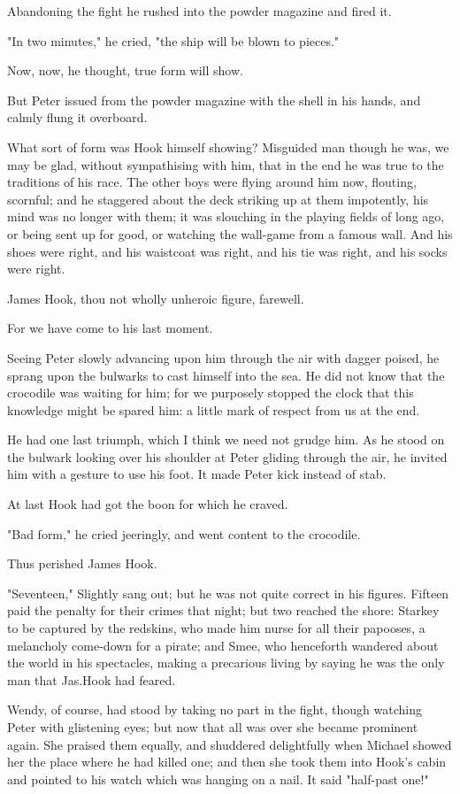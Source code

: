 Abandoning the fight he rushed into the powder magazine and fired it.

"In two minutes," he cried, "the ship will be blown to pieces."

Now, now, he thought, true form will show.

But Peter issued from the powder magazine with the shell in his hands,
and calmly flung it overboard.

What sort of form was Hook himself showing?
Misguided man though he was,
we may be glad, without sympathising with him,
that in the end he was true to the traditions of his race.
The other boys were flying around him now, flouting, scornful;
and he staggered about the deck striking up at them impotently,
his mind was no longer with them;
it was slouching in the playing fields of long ago, or being sent up for good,
or watching the wall-game from a famous wall.
And his shoes were right, and his waistcoat was right, and his tie was right, and his socks were right.

James Hook, thou not wholly unheroic figure, farewell.

For we have come to his last moment.

Seeing Peter slowly advancing upon him through the air with dagger poised,
he sprang upon the bulwarks to cast himself into the sea.
He did not know that the crocodile was waiting for him;
for we purposely stopped the clock that this knowledge might be spared him:
a little mark of respect from us at the end.

He had one last triumph, which I think we need not grudge him.
As he stood on the bulwark looking over his shoulder at Peter gliding through the air,
he invited him with a gesture to use his foot.
It made Peter kick instead of stab.

At last Hook had got the boon for which he craved.

"Bad form," he cried jeeringly, and went content to the crocodile.

Thus perished James Hook.

"Seventeen," Slightly sang out;
but he was not quite correct in his figures.
Fifteen paid the penalty for their crimes that night;
but two reached the shore:
Starkey to be captured by the redskins,
who made him nurse for all their papooses, a melancholy come-down for a pirate;
and Smee, who henceforth wandered about the world in his spectacles,
making a precarious living by saying he was the only man that Jas.\@ Hook had feared.

Wendy, of course, had stood by taking no part in the fight,
though watching Peter with glistening eyes;
but now that all was over she became prominent again.
She praised them equally, and shuddered delightfully when Michael showed her the place where he had killed one;
and then she took them into Hook's cabin and pointed to his watch which was hanging on a nail.
It said "half-past one!"

